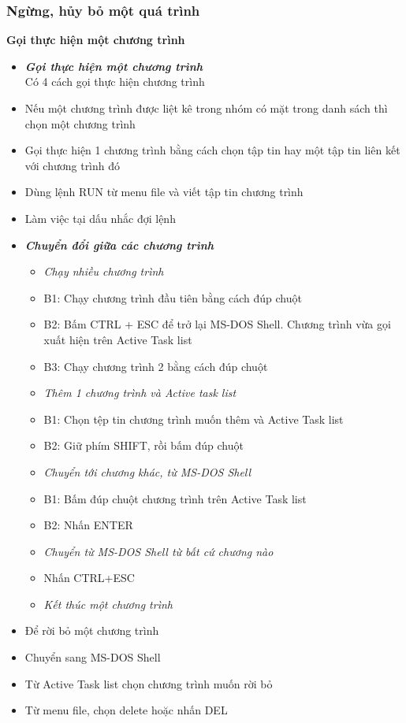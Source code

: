 \documentclass[12pt,a4paper]{article}
\begin{document}
\subsubsection{Ngừng, hủy bỏ một quá trình}
\textbf{Gọi thực hiện một chương trình}
\begin{itemize}
	\item \textbf{\textit{Gọi thực hiện một chương trình}}\\
	Có 4 cách gọi thực hiện chương trình
	\item Nếu một chương trình được liệt kê trong nhóm có mặt trong danh sách thì chọn một chương trình
	\item Gọi thực hiện 1 chương trình bằng cách chọn tập tin hay một tập tin liên kết với chương trình đó
	\item Dùng lệnh RUN  từ menu file và viết tập tin chương trình
	\item Làm việc tại dấu nhắc đợi lệnh
	\item \textbf{\textit{Chuyển đổi giữa các chương trình}}
	\begin{itemize}
		\item [] \textit{Chạy nhiều chương trình}
		\item [] B1: Chạy chương trình đầu tiên bằng cách đúp chuột
		\item [] B2: Bấm CTRL + ESC để trở lại MS-DOS Shell. Chương trình vừa gọi xuất hiện trên Active Task list
		\item [] B3: Chạy chương trình 2 bằng cách đúp chuột\\
		
		\item [] \textit{Thêm 1 chương trình và Active task list}
		\item [] B1: Chọn tệp tin chương trình muốn thêm và Active Task list
		\item [] B2: Giữ phím SHIFT, rồi bấm đúp chuột\\
		
		\item [] \textit{Chuyển tới chương khác, từ MS-DOS Shell}
		\item [] B1: Bấm đúp chuột chương trình trên Active Task list 
		\item [] B2: Nhấn ENTER\\
		
		\item [] \textit{Chuyển từ MS-DOS Shell từ bất cứ chương nào}
		\item [] Nhấn CTRL+ESC \\
		
		\item [] \textit{Kết thúc một chương trình}
	\end{itemize}
\end{itemize}
	\begin{itemize}
	\item Để rời bỏ một chương trình 
	\item Chuyển sang MS-DOS Shell
	\item Từ Active Task list chọn chương trình muốn rời bỏ
	\item Từ menu file, chọn delete hoặc nhấn DEL
\end{itemize}
\end{document}
